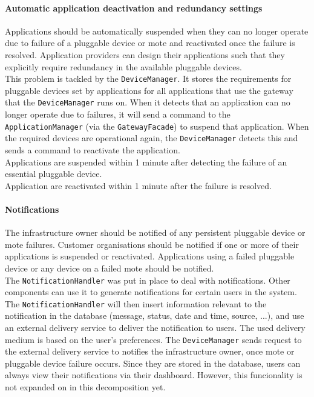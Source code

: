         \paragraph{Automatic application deactivation and redundancy settings}
            Applications should be automatically suspended when they can no longer
            operate due to failure of a pluggable device or mote and reactivated
            once the failure is resolved. Application providers can design their
            applications such that they explicitly require redundancy in
            the available pluggable devices. \\
            This problem is tackled by the \texttt{DeviceManager}. It
            stores the requirements for pluggable devices set by applications for all
            applications that use the gateway that the \texttt{DeviceManager}
            runs on. When it detects that an application can no longer operate
            due to failures, it will send a command to the \texttt{ApplicationManager}
            (via the \texttt{GatewayFacade})
            to suspend that application. When the required devices are operational
            again, the \texttt{DeviceManager} detects this and sends a
            command to reactivate the application. \\

            Applications are suspended within 1 minute after detecting
            the failure of an essential pluggable device. \\
            Application are reactivated within 1 minute after the failure is resolved.

        \paragraph{Notifications}
            The infrastructure owner should be notified of any persistent
            pluggable device or mote failures. Customer organisations should be
            notified if one or more of their applications is suspended or
            reactivated. Applications using a failed pluggable device or any device
            on a failed mote should be notified. \\
            The \texttt{NotificationHandler} was put in place to deal with
            notifications. Other components can use it to generate notifications for
            certain users in the system. The \texttt{NotificationHandler} will then
            insert information relevant to the notification in the database (message,
            status, date and time, source, ...), and use an external delivery
            service to deliver the notification to users. The used delivery medium
            is based on the user's preferences. The \texttt{DeviceManager} sends request
            to the external delivery service to notifies the
            infrastructure owner, once mote or pluggable device failure occurs.
            Since they are stored in the database, users can always view
            their notifications via their dashboard. However, this funcionality is not
            expanded on in this decomposition yet. \\

